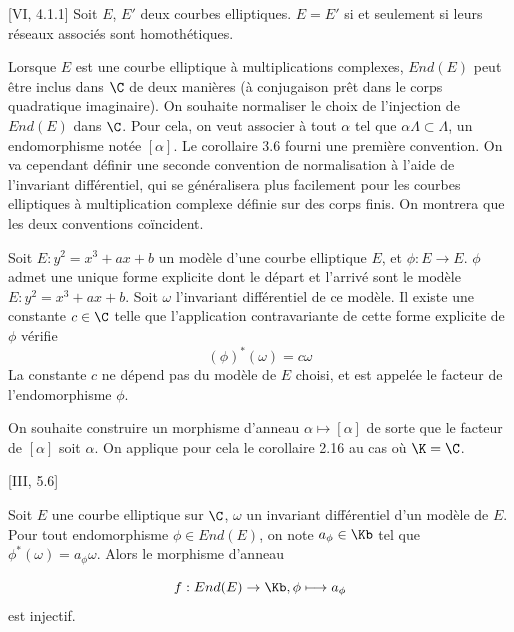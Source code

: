 \begin{Coro}\cite{Sil09}[VI, 4.1.1]
	Soit $E$, $E'$ deux courbes elliptiques. $E = E'$ si et seulement si leurs réseaux associés sont homothétiques.
\end{Coro}


Lorsque $E$ est une courbe elliptique à multiplications complexes, $End(E)$ peut être inclus dans $\C$ de deux manières (à conjugaison prêt dans le corps quadratique imaginaire). On souhaite normaliser le choix de l'injection de $End(E)$ dans $\C$. Pour cela, on veut associer à tout $\alpha$ tel que $\alpha\Lambda\subset\Lambda$, un endomorphisme notée $[\alpha]$. Le corollaire 3.6 fourni une première convention. On va cependant définir une seconde convention de normalisation à l'aide de l'invariant différentiel, qui se généralisera plus facilement pour les courbes elliptiques à multiplication complexe définie sur des corps finis. On montrera que les deux conventions coïncident.

\begin{Def}
	Soit $E : y^2 = x^3 + ax + b$ un modèle d'une courbe elliptique $E$, et $\phi : E\rightarrow E$. $\phi$ admet une unique forme explicite dont le départ et l'arrivé sont le modèle $E : y^2 = x^3 + ax + b$. Soit $\omega$ l'invariant différentiel de ce modèle. Il existe une constante $c\in\C$ telle que l'application contravariante de cette forme explicite de $\phi$ vérifie 
	\begin{equation*}
		(\phi)^{*}(\omega) = c\omega
	\end{equation*}
	La constante $c$ ne dépend pas du modèle de $E$ choisi, et est appelée le facteur de l'endomorphisme $\phi$.
\end{Def}

On souhaite construire un morphisme d'anneau $\alpha\mapsto\left[ \alpha\right]$ de sorte que le facteur de $\left[ \alpha\right]$ soit $\alpha$. On applique pour cela le corollaire 2.16 au cas où $\K = \C$.

\begin{Prop}\cite{Sil09}[III, 5.6]
	
	Soit $E$ une courbe elliptique sur $\C$, $\omega$ un invariant différentiel d'un modèle de $E$. Pour tout endomorphisme $\phi\in End(E)$, on note $a_{\phi}\in\Kb$ tel que $\phi^{*}(\omega) = a_{\phi}\omega$. Alors le morphisme d'anneau
	
	\begin{equation*}
		f : End(E)\rightarrow\Kb , \phi\longmapsto a_{\phi}
	\end{equation*}
	est injectif.
	
\end{Prop}


